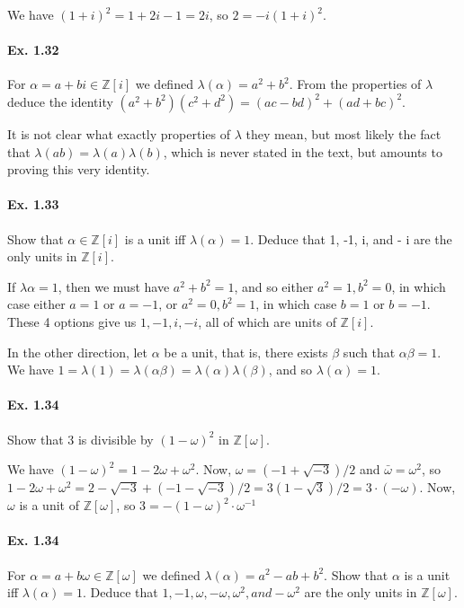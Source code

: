 \documentclass[notitlepage]{article}
\theoremstyle{definition}
\newcommand\Z{\mathbb{Z}}
\begin{document}
We have $(1+i)^2 = 1 + 2i -1 = 2i$, so $2 = -i(1+i)^2$.

\paragraph{Ex. 1.32}
For $\alpha = a + bi \in \Z[i]$ we defined $\lambda(\alpha) =
a^2 + b^2$. From the properties of $\lambda$ deduce the identity $(a^2
+ b^2)(c^2 + d^2) = (ac - bd)^2 + (ad + bc)^2$.

It is not clear what exactly properties of $\lambda$ they mean, but
most likely the fact that $\lambda(ab) = \lambda(a)\lambda(b)$, which
is never stated in the text, but amounts to proving this very
identity.

\paragraph{Ex. 1.33}
Show that $\alpha \in \Z[i]$ is a unit iff  $\lambda(\alpha) = 1$. Deduce that 1, -1, i, and - i are the only units in $\Z[i]$.

If $\lambda{\alpha} = 1$, then we must have $a^2 + b^2 = 1$, and so
either $a^2 = 1, b^2 = 0$, in which case either $a = 1$ or $a = -1$,
or $a^2 = 0, b^2 = 1$, in which case $b = 1$ or $b = -1$. These 4
options give us $1, -1, i, -i$, all of which are units of $\Z[i]$.

In the other direction, let $\alpha$ be a unit, that is, there exists
$\beta$ such that $\alpha \beta = 1$. We have $1 = \lambda(1) =
\lambda(\alpha\beta) = \lambda(\alpha)\lambda(\beta)$, and so
$\lambda(\alpha) = 1$.

\paragraph{Ex. 1.34}
Show that 3 is divisible by $(1 - \omega)^2$ in $\Z[\omega]$.

We have $(1 - \omega)^2 = 1 - 2\omega + \omega^2$. Now, $\omega =
(-1+\sqrt{-3})/2$ and $\bar{\omega} = \omega^2$, so $1 - 2\omega +
\omega^2 = 2 - \sqrt{-3}+(-1-\sqrt{-3})/2 = 3(1-\sqrt{3})/2 =
3\cdot(-\omega)$. Now, $\omega$ is a unit of $\Z[\omega]$, so
$3 = -(1 - \omega)^2 \cdot \omega^{-1}$

\paragraph{Ex. 1.34}
For $\alpha = a + b\omega \in \Z[\omega]$ we defined
$\lambda(\alpha) = a^2 - ab + b^2$. Show that $\alpha$ is a unit iff
$\lambda(\alpha) = 1$. Deduce that $1, -1, \omega, -\omega, \omega^2 ,
and -\omega^2$ are the only units in $\Z[\omega]$.
\end{document}
